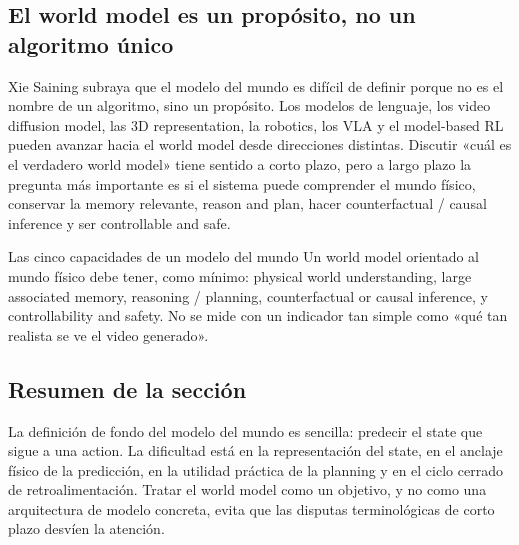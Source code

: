 \subsection{El world model es un propósito, no un algoritmo único}

Xie Saining subraya que el modelo del mundo es difícil de definir porque no es el nombre de un algoritmo, sino un propósito. Los modelos de lenguaje, los video diffusion model, las 3D representation, la robotics, los VLA y el model-based RL pueden avanzar hacia el world model desde direcciones distintas. Discutir «cuál es el verdadero world model» tiene sentido a corto plazo, pero a largo plazo la pregunta más importante es si el sistema puede comprender el mundo físico, conservar la memory relevante, reason and plan, hacer counterfactual / causal inference y ser controllable and safe.

\begin{importantbox}{Las cinco capacidades de un modelo del mundo}
Un world model orientado al mundo físico debe tener, como mínimo: physical world understanding, large associated memory, reasoning / planning, counterfactual or causal inference, y controllability and safety. No se mide con un indicador tan simple como «qué tan realista se ve el video generado».
\end{importantbox}

\subsection{Resumen de la sección}

La definición de fondo del modelo del mundo es sencilla: predecir el state que sigue a una action. La dificultad está en la representación del state, en el anclaje físico de la predicción, en la utilidad práctica de la planning y en el ciclo cerrado de retroalimentación. Tratar el world model como un objetivo, y no como una arquitectura de modelo concreta, evita que las disputas terminológicas de corto plazo desvíen la atención.

